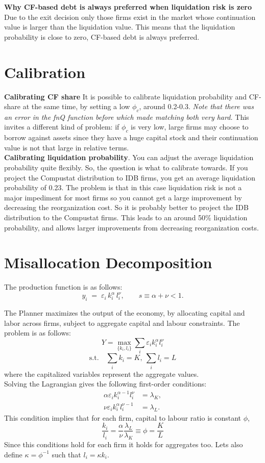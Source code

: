 \documentclass[12pt]{article}
\begin{document}
\textbf{Why CF-based debt is always preferred when liquidation risk is zero} \\
Due to the exit decision only those firms exist in the market whose continuation value is larger than the liquidation value. This means that the liquidation probability is close to zero, CF-based debt is always preferred. \\
\newpage


\section*{Calibration} 
\textbf{Calibrating CF share} It is possible to calibrate liquidation probability and CF-share at the same time, by setting a low $\phi_c$, around 0.2-0.3. \textit{Note that there was an error in the fnQ function before which made matching both very hard.} This invites a different kind of problem: if $\phi_c$ is very low, large firms may choose to borrow against assets since they have a huge capital stock and their continuation value is not that large in relative terms. \\
\textbf{Calibrating liquidation probability}. You can adjust the average liquidation probability quite flexibly. So, the question is what to calibrate towards. If you project the Compustat distribution to IDB firms, you get an average liquidation probability of 0.23. The problem is that in this case liquidation risk is not a major impediment for most firms so you cannot get a large improvement by decreasing the reorganization cost. So it is probably better to project the IDB distribution to the Compustat firms. This leads to an around 50\% liquidation probability, and allows larger improvements from decreasing reorganization costs. 

\section*{Misallocation Decomposition}

The production function is as follows: 
$$   y_i \;=\; \varepsilon_i\,k_i^{\alpha}\, l_i^{\nu}, \qquad s \equiv \alpha+\nu < 1. $$

The Planner maximizes the output of the economy, by allocating capital and labor across firms, subject to aggregate capital and labour constraints. The problem is as follows:
$$ Y =  \max_{\{k_i,l_i\}} \sum_i \varepsilon_i k_i^{\alpha}l_i^{\nu} $$ 
$$ \text{s.t.}\quad  \sum_i k_i= K,\ \sum_i l_i= L $$
where the capitalized variables represent the aggregate values. \\
Solving the Lagrangian gives the following first-order conditions:
$$ \begin{aligned}
\alpha \varepsilon_i k_i^{\alpha-1}l_i^{\nu} &= \lambda_K, \\
\nu \varepsilon_i k_i^{\alpha}l_i^{\nu-1} &= \lambda_L.
\end{aligned} $$
This condition implies that for each firm, capital to labour ratio is constant $\phi$, 
$$ \frac{k_i}{l_i} = \frac{\alpha}{\nu}\frac{\lambda_L}{\lambda_K} \equiv \phi  = \frac{K}{L} $$
Since this conditions hold for each firm it holds for aggregates too. Lets also define $\kappa = \phi^{-1}$ such that $l_i = \kappa k_i$. 
\end{document}

